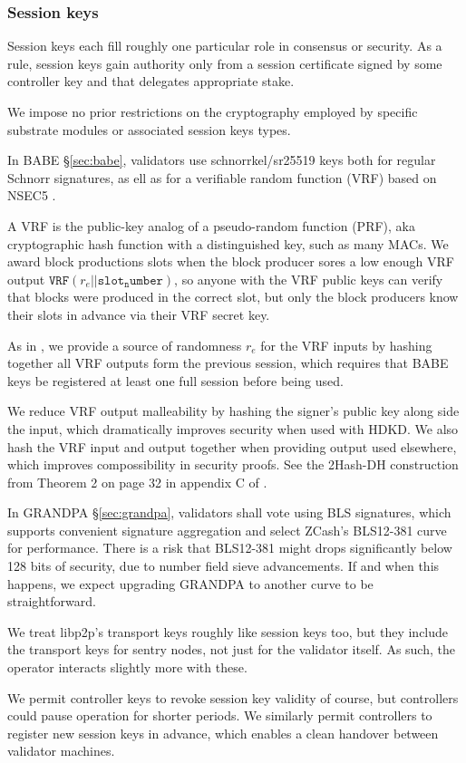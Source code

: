 \subsubsection{Session keys}\label{sec:session_keys}

Session keys each fill roughly one particular role in consensus or security.  As a rule, session keys gain authority only from a session certificate signed by some controller key and that delegates appropriate stake.  

We impose no prior restrictions on the cryptography employed by specific substrate modules or associated session keys types.  

In BABE \S\ref{sec:babe}, validators use schnorrkel/sr25519 keys both for regular Schnorr signatures, as ell as for a verifiable random function (VRF) based on NSEC5 \cite{NSEC5}.  

A VRF is the public-key analog of a pseudo-random function (PRF), aka cryptographic hash function with a distinguished key, such as many MACs.  We award block productions slots when the block producer sores a low enough VRF output $\mathtt{VRF}(r_e || \mathtt{slot_number} )$, so anyone with the VRF public keys can verify that blocks were produced in the correct slot, but only the block producers know their slots in advance via their VRF secret key.

As in \cite{Praos}, we provide a source of randomness $r_e$ for the VRF inputs by hashing together all VRF outputs form the previous session, which requires that BABE keys be registered at least one full session before being used.

We reduce VRF output malleability by hashing the signer's public key along side the input, which dramatically improves security when used with HDKD.  We also hash the VRF input and output together when providing output used elsewhere, which improves compossibility in security proofs. See the 2Hash-DH construction from Theorem 2 on page 32 in appendix C of \cite{Praos}.  

In GRANDPA \S\ref{sec:grandpa}, validators shall vote using BLS signatures, which supports convenient signature aggregation and select ZCash's BLS12-381 curve for performance.  There is a risk that BLS12-381 might drops significantly below 128 bits of security, due to number field sieve advancements.  If and when this happens, we expect upgrading GRANDPA to another curve to be straightforward. 


We treat libp2p's transport keys roughly like session keys too, but they include the transport keys for sentry nodes, not just for the validator itself.  As such, the operator interacts slightly more with these.

We permit controller keys to revoke session key validity of course, but controllers could pause operation for shorter periods.  We similarly permit controllers to register new session keys in advance, which enables a clean handover between validator machines.

